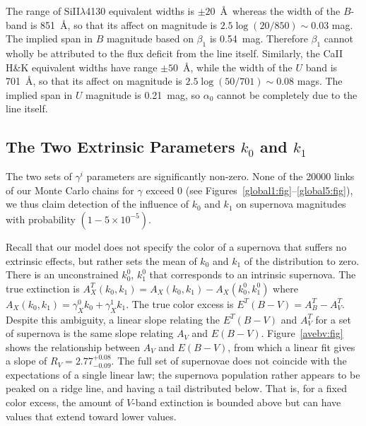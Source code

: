 \documentclass{aastex61}   	%
\begin{document}
The range of SiII$\lambda$4130 equivalent widths is $\pm 20$~\AA\ whereas the width of the $B$-band is 851~\AA, so that its affect on magnitude
is
$2.5 \log{(20/850)} \sim 0.03$ mag.  
The implied span in $B$ magnitude based on $\beta_1$ is 0.54~mag.  Therefore $\beta_1$ cannot wholly be attributed to the flux deficit
from the line itself.
Similarly, the CaII H\&K equivalent widths have range $\pm 50$~\AA, while the width of the $U$ band is
701~\AA, so that its affect on magnitude
is
$2.5 \log{(50/701)} \sim 0.08$ mags.   The implied span in $U$ magnitude is  0.21~mag, so $\alpha_0$ cannot be completely due to the line itself.

\subsection{The Two Extrinsic Parameters $k_0$ and $k_1$}
The two sets of  $\gamma^i$ parameters  are significantly non-zero. 
None of the 20000 links of 
our Monte Carlo chains for $\gamma$ exceed 0 (see Figures~\ref{global1:fig}--\ref{global5:fig}), we thus claim detection of the
influence of $k_0$ and $k_1$  on supernova magnitudes
with probability $(1-5\times 10^{-5})$.


\color{red}
Recall that our model does not specify the color of a supernova that suffers no extrinsic effects, but rather sets the
mean of $k_0$ and $k_1$ of the distribution to zero.
There is an unconstrained $k_0^0$, $k_1^0$ that corresponds to an intrinsic supernova.  The true extinction is
$A^T_X(k_0,k_1)= A_X(k_0,k_1) -  A_X(k^0_0,k^0_1)$ where $A_X(k_0,k_1) =  \gamma^0_X k_0 + \gamma^1_X k_1$.
The true color excess is $E^T(B-V) = A^T_B-A^T_V$.
Despite this ambiguity, a linear slope relating the $E^T(B-V)$ and $A^T_V$ for a set of supernova is the same slope
relating $A_V$ and $E(B-V)$.
\color{black}
Figure~\ref{avebv:fig} shows the relationship between $A_V$ and $E(B-V)$, from
which a linear fit gives a slope of $R_V=2.77^{+0.08}_{-0.09}$.
\color{red}
The full set of supernovae does not coincide with the expectations of a single linear law; the supernova population rather appears to be peaked
on a ridge line, and having a tail distributed below.  That is, for a fixed color excess, the amount of $V$-band extinction is bounded above
but can have values that extend toward lower values.
\end{document}
